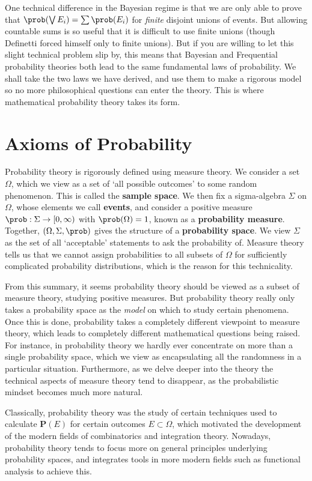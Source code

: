 %
One technical difference in the Bayesian regime is that we are only able to prove that $\prob(\bigvee E_i) = \sum \prob(E_i)$ for {\it finite} disjoint unions of events. But allowing countable sums is so useful that it is difficult to use finite unions (though Definetti forced himself only to finite unions). But if you are willing to let this slight technical problem slip by, this means that Bayesian and Frequential probability theories both lead to the same fundamental laws of probability. We shall take the two laws we have derived, and use them to make a rigorous model so no more philosophical questions can enter the theory. This is where mathematical probability theory takes its form.

\section{Axioms of Probability}

Probability theory is rigorously defined using measure theory. We consider a set $\Omega$, which we view as a set of `all possible outcomes' to some random phenomenon. This is called the {\bf sample space}. We then fix a sigma-algebra $\Sigma$ on $\Omega$, whose elements we call {\bf events}, and consider a positive measure $\prob: \Sigma \to [0,\infty)$ with $\prob(\Omega) = 1$, known as a {\bf probability measure}. Together, $(\Omega, \Sigma, \prob)$ gives the structure of a {\bf probability space}. We view $\Sigma$ as the set of all `acceptable' statements to ask the probability of. Measure theory tells us that we cannot assign probabilities to all subsets of $\Omega$ for sufficiently complicated probability distributions, which is the reason for this technicality.

From this summary, it seems probability theory should be viewed as a subset of measure theory, studying positive measures. But probability theory really only takes a probability space as the \emph{model} on which to study certain phenomena. Once this is done, probability takes a completely different viewpoint to measure theory, which leads to completely different mathematical questions being raised. For instance, in probability theory we hardly ever concentrate on more than a single probability space, which we view as encapsulating all the randomness in a particular situation. Furthermore, as we delve deeper into the theory the technical aspects of measure theory tend to disappear, as the probabilistic mindset becomes much more natural.

Classically, probability theory was the study of certain techniques used to calculate $\mathbf{P}(E)$ for certain outcomes $E \subset \Omega$, which motivated the development of the modern fields of combinatorics and integration theory. Nowadays, probability theory tends to focus more on general principles underlying probability spaces, and integrates tools in more modern fields such as functional analysis to achieve this.

